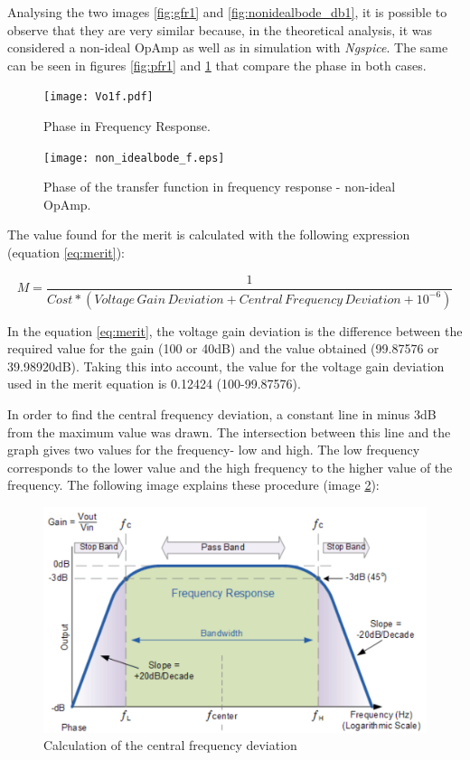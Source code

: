 Analysing the two images \ref{fig:gfr1} and \ref{fig:nonidealbode_db1}, it is possible to observe that they are very similar because, in the theoretical analysis, it was considered a non-ideal OpAmp as well as in simulation with \textit{Ngspice}. The same can be seen in figures \ref{fig:pfr1} and \ref{fig:nonidealbode_f1} that compare the phase in both cases.

\begin{figure}[h]
  \centering
  \begin{minipage}[b]{0.45\textwidth}
    \texttt{[image: Vo1f.pdf]}
    \caption{Phase in Frequency Response.}
    \label{fig:pfr1}
  \end{minipage}
  \hfill
  \begin{minipage}[b]{0.5\textwidth}
    \texttt{[image: non\_idealbode\_f.eps]}
    \caption{Phase of the transfer function in frequency response - non-ideal OpAmp.}
    \label{fig:nonidealbode_f1}
  \end{minipage}
\end{figure}
\newpage
The value found for the merit is calculated with the following expression (equation \ref{eq:merit}):

\begin{equation}
    M= \frac{1}{Cost\ast (Voltage \, Gain \, Deviation + Central\, Frequency\, Deviation+10^{-6})}
  \label{eq:merit}
\end{equation}

In the equation \ref{eq:merit}, the voltage gain deviation is the difference between the required value for the gain (100 or 40dB) and the value obtained (99.87576 or 39.98920dB). Taking this into account, the value for the voltage gain deviation used in the merit equation is 0.12424 (100-99.87576).    

In order to find the central frequency deviation, a constant line in minus 3dB from the maximum value was drawn. The intersection between this line and the graph gives two values for the frequency- low and high. The low frequency corresponds to the lower value and the high frequency to the higher value of the frequency. The following image explains these procedure (image \ref{fig:central_frequency_deviation}):

\begin{figure}[h] \centering
\includegraphics[width=0.7\linewidth]{central frequency deviation.pdf}
\caption{Calculation of the central frequency deviation}
\label{fig:central_frequency_deviation}
\end{figure}

